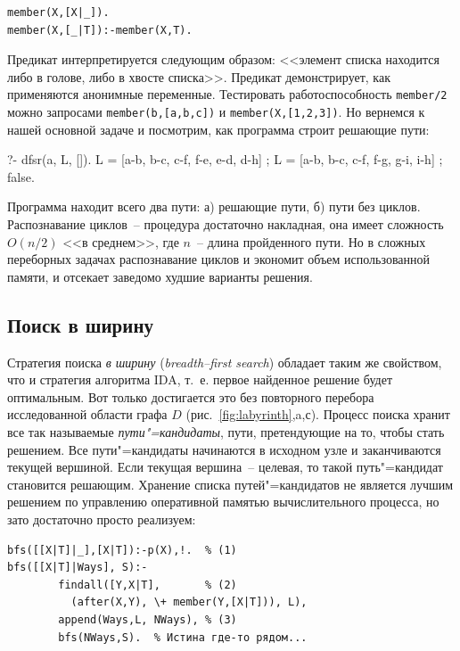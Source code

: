 \documentclass[a4paper,14pt, openany, twoside, final]{extbook} %
\newcommand{\eeng}[1]{\emph{\foreignlanguage{english}{#1}}}
\begin{document}
\begin{verbatim}
member(X,[X|_]).
member(X,[_|T]):-member(X,T).
\end{verbatim}


Предикат интерпретируется следующим образом: <<элемент списка находится либо в голове, либо в хвосте списка>>.  Предикат демонстрирует, как применяются анонимные переменные.  Тестировать работоспособность \texttt{member/2} можно запросами \texttt{member(b,[a,b,c])} и \texttt{member(X,[1,2,3])}.  Но вернемся к нашей основной задаче и посмотрим, как программа строит решающие пути:

\begin{proexp}
?- dfsr(a, L, []).
L = [a-b, b-c, c-f, f-e, e-d, d-h] ;
L = [a-b, b-c, c-f, f-g, g-i, i-h] ;
false.
\end{proexp}


Программа находит всего два пути: а) решающие пути, б) пути без циклов.  Распознавание циклов~-- процедура достаточно накладная, она имеет сложность $O(n/2)$ <<в среднем>>, где $n$~-- длина пройденного пути.  Но в сложных переборных задачах распознавание циклов и экономит объем использованной памяти, и отсекает заведомо худшие варианты решения.

\subsection{Поиск в ширину}
\label{sec:breadthfirst}

Стратегия поиска \emph{в ширину} (\eeng{breadth--first search}) обладает таким же свойством, что и стратегия алгоритма IDA, т.~е. первое найденное решение будет оптимальным.  Вот только достигается это без повторного перебора исследованной области графа $D$ (рис.~\ref{fig:labyrinth},a,с).  Процесс поиска хранит все так называемые \emph{пути"=кандидаты}, пути, претендующие на то, чтобы стать решением.  Все пути"=кандидаты начинаются в исходном узле и заканчиваются текущей вершиной.  Если текущая вершина~-- целевая, то такой путь"=кандидат становится решающим.  Хранение списка путей"=кандидатов не является лучшим решением по управлению оперативной памятью вычислительного процесса, но зато достаточно просто реализуем:

\begin{verbatim}
bfs([[X|T]|_],[X|T]):-p(X),!.  % (1)
bfs([[X|T]|Ways], S):-
        findall([Y,X|T],       % (2)
          (after(X,Y), \+ member(Y,[X|T])), L),
        append(Ways,L, NWays), % (3)
        bfs(NWays,S).  % Истина где-то рядом...
\end{verbatim}
\end{document}

